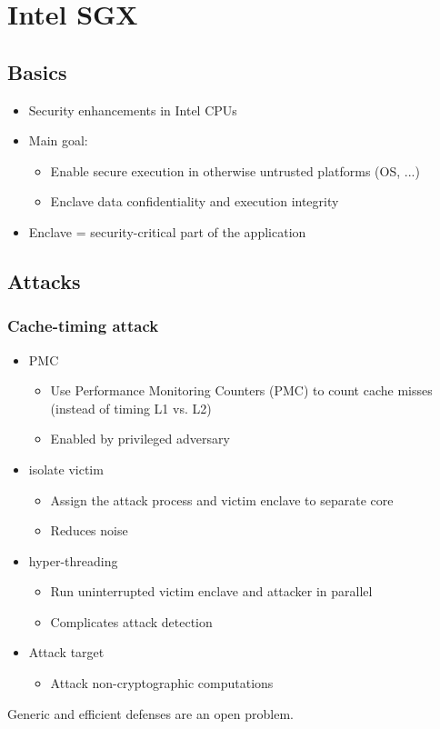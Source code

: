 
\section{Intel SGX}
\subsection{Basics}
\begin{itemize}
  \item Security enhancements in Intel CPUs
  \item Main goal:
    \begin{itemize}
      \item Enable secure execution in otherwise untrusted platforms (OS, ...)
      \item Enclave data confidentiality and execution integrity
    \end{itemize}
  \item Enclave = security-critical part of the application
\end{itemize}

\subsection{Attacks}
\subsubsection{Cache-timing attack}
\begin{itemize}
  \item  PMC
    \begin{itemize}
      \item Use Performance Monitoring Counters (PMC) to count cache misses
	(instead of timing L1 vs. L2)
      \item Enabled by privileged adversary
      \end{itemize}
  \item  isolate victim
    \begin{itemize}
      \item Assign the attack process and victim enclave to separate core
      \item Reduces noise
      \end{itemize}
  \item  hyper-threading
    \begin{itemize}
      \item Run uninterrupted victim enclave and attacker in parallel
      \item Complicates attack detection
      \end{itemize}
  \item Attack target
    \begin{itemize}
      \item Attack non-cryptographic computations
      \end{itemize}
\end{itemize}
Generic and efficient defenses  are an open problem.
